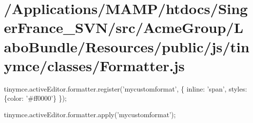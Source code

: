 \hypertarget{_2_applications_2_m_a_m_p_2htdocs_2_singer_france__s_v_n_2src_2_acme_group_2_labo_bundle_2_resou6d6c1c8f8d6f0116bfd7e0c61305c1c4}{\section{/\+Applications/\+M\+A\+M\+P/htdocs/\+Singer\+France\+\_\+\+S\+V\+N/src/\+Acme\+Group/\+Labo\+Bundle/\+Resources/public/js/tinymce/classes/\+Formatter.\+js}
}
tinymce.\+active\+Editor.\+formatter.\+register('mycustomformat', \{ inline\+: 'span', styles\+: \{color\+: '\#ff0000'\} \});

tinymce.\+active\+Editor.\+formatter.\+apply('mycustomformat');


\begin{DoxyCodeInclude}
\end{DoxyCodeInclude}
 